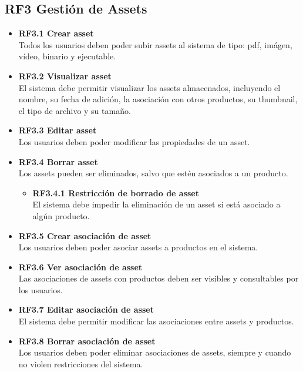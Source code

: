 \documentclass[12pt.a4paper]{article}
\begin{document}
\subsection*{RF3 Gestión de Assets}

\begin{itemize}
    \item \textbf{RF3.1 Crear asset} \\
    Todos los usuarios deben poder subir assets al sistema de tipo: pdf, imágen, vídeo, binario y ejecutable.

    \item \textbf{RF3.2 Visualizar asset} \\
    El sistema debe permitir visualizar los assets almacenados, incluyendo el nombre, su fecha de adición, la asociación con otros productos, su thumbnail, el tipo de archivo y su tamaño.

    \item \textbf{RF3.3 Editar asset} \\
    Los usuarios deben poder modificar las propiedades de un asset.

    \item \textbf{RF3.4 Borrar asset} \\
    Los assets pueden ser eliminados, salvo que estén asociados a un producto.
    \begin{itemize}
        \item \textbf{RF3.4.1 Restricción de borrado de asset} \\
        El sistema debe impedir la eliminación de un asset si está asociado a algún producto.
    \end{itemize}

    \item \textbf{RF3.5 Crear asociación de asset} \\
    Los usuarios deben poder asociar assets a productos en el sistema.

    \item \textbf{RF3.6 Ver asociación de asset} \\
    Las asociaciones de assets con productos deben ser visibles y consultables por los usuarios.

    \item \textbf{RF3.7 Editar asociación de asset} \\
    El sistema debe permitir modificar las asociaciones entre assets y productos.

    \item \textbf{RF3.8 Borrar asociación de asset} \\
    Los usuarios deben poder eliminar asociaciones de assets, siempre y cuando no violen restricciones del sistema.
\end{itemize}
\end{document}
